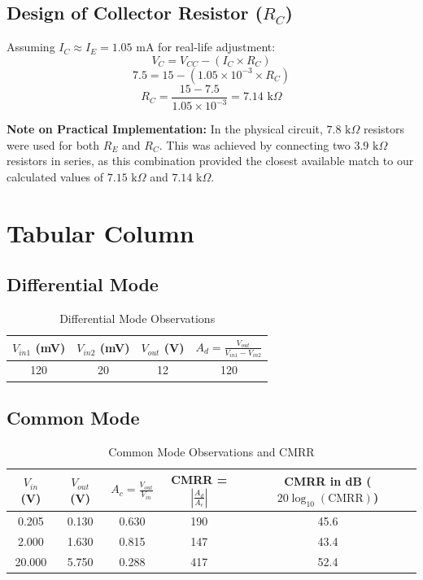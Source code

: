 \documentclass[12pt,a4paper]{article}
\begin{document}
\subsection{Design of Collector Resistor ($R_C$)}
Assuming $I_C \approx I_E = 1.05$ mA for real-life adjustment:
$$V_C = V_{CC} - (I_C \times R_C)$$
$$7.5 = 15 - (1.05 \times 10^{-3} \times R_C)$$
$$R_C = \frac{15 - 7.5}{1.05 \times 10^{-3}} = 7.14 \text{ k}\Omega$$

\vspace{10pt}
\noindent \textbf{Note on Practical Implementation:} 
In the physical circuit, $7.8 \text{ k}\Omega$ resistors were used for both $R_E$ and $R_C$. This was achieved by connecting two $3.9 \text{ k}\Omega$ resistors in series, as this combination provided the closest available match to our calculated values of $7.15 \text{ k}\Omega$ and $7.14 \text{ k}\Omega$.

\section{Tabular Column}

\subsection{Differential Mode}
\begin{table}[H]
\centering
\begin{tabular}{|c|c|c|c|}
\hline
\textbf{$V_{in1}$ (mV)} & \textbf{$V_{in2}$ (mV)} & \textbf{$V_{out}$ (V)} & \textbf{$A_d = \frac{V_{out}}{V_{in1} - V_{in2}}$} \\
\hline
120 & 20 & 12 & 120 \\
\hline
\end{tabular}
\caption{Differential Mode Observations}
\end{table}

\subsection{Common Mode}
\begin{table}[H]
\centering
\begin{tabular}{|c|c|c|c|c|}
\hline
\textbf{$V_{in}$ (V)} & \textbf{$V_{out}$ (V)} & \textbf{$A_c = \frac{V_{out}}{V_{in}}$} & \textbf{CMRR = $\left| \frac{A_d}{A_c} \right|$} & \textbf{CMRR in dB ($20 \log_{10}(\text{CMRR})$)} \\
\hline
0.205 & 0.130 & 0.630 & 190 & 45.6 \\
2.000 & 1.630 & 0.815 & 147 & 43.4 \\
20.000 & 5.750 & 0.288 & 417 & 52.4 \\
\hline
\end{tabular}
\caption{Common Mode Observations and CMRR}
\end{table}
\end{document}
